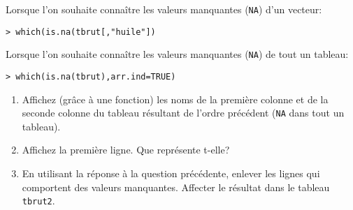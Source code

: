 \documentclass[a4paper,10pt,french]{article}
\newcommand{\code}[1]{\texttt{#1}}
\begin{document}
Lorsque l'on souhaite connaître les valeurs manquantes (\code{NA}) d'un vecteur:
\begin{verbatim}
> which(is.na(tbrut[,"huile"])
\end{verbatim}
Lorsque l'on souhaite connaître les valeurs manquantes (\code{NA}) de tout un tableau:
\begin{verbatim}
> which(is.na(tbrut),arr.ind=TRUE)
\end{verbatim}
\begin{enumerate}
\item Affichez (grâce à une fonction)  les noms de la première colonne et de la
  seconde colonne du tableau résultant de l'ordre précédent (\code{NA} dans tout un tableau).
\item Affichez la première ligne. Que représente t-elle?
\item En utilisant la réponse à la question précédente, enlever les
  lignes qui comportent des valeurs manquantes. Affecter le résultat
  dans le tableau \texttt{tbrut2}.
\end{enumerate}
\end{document}
